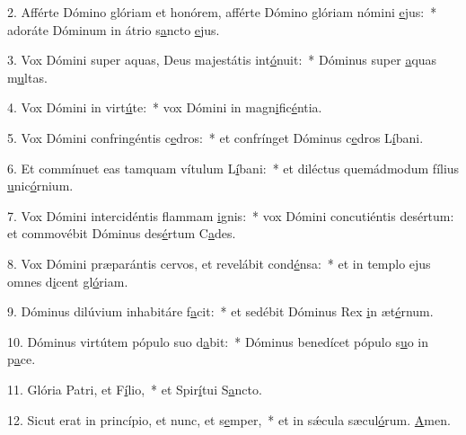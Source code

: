 2. Afférte Dómino glóriam et honórem, afférte Dómino glóriam nómini \uline{e}jus:~* adoráte Dóminum in átrio s\uline{a}ncto \uline{e}jus.\par 
3. Vox Dómini super aquas, Deus majestátis int\uline{ó}nuit:~* Dóminus super \uline{a}quas m\uline{u}ltas.\par 
4. Vox Dómini in virt\uline{ú}te:~* vox Dómini in magn\uline{i}fic\uline{é}ntia.\par 
5. Vox Dómini confringéntis c\uline{e}dros:~* et confrínget Dóminus c\uline{e}dros L\uline{í}bani.\par 
6. Et commínuet eas tamquam vítulum L\uline{í}bani:~* et diléctus quemádmodum fílius \uline{u}nic\uline{ó}rnium.\par 
7. Vox Dómini intercidéntis flammam \uline{i}gnis:~* vox Dómini concutiéntis desértum: et commovébit Dóminus des\uline{é}rtum C\uline{a}des.\par 
8. Vox Dómini præparántis cervos, et revelábit cond\uline{é}nsa:~* et in templo ejus omnes d\uline{i}cent gl\uline{ó}riam.\par 
9. Dóminus dilúvium inhabitáre f\uline{a}cit:~* et sedébit Dóminus Rex \uline{i}n æt\uline{é}rnum.\par 
10. Dóminus virtútem pópulo suo d\uline{a}bit:~* Dóminus benedícet pópulo s\uline{u}o in p\uline{a}ce.\par 
11. Glória Patri, et F\uline{í}lio,~* et Spir\uline{í}tui S\uline{a}ncto.\par 
12. Sicut erat in princípio, et nunc, et s\uline{e}mper,~* et in sǽcula sæcul\uline{ó}rum. \uline{A}men.\par 
